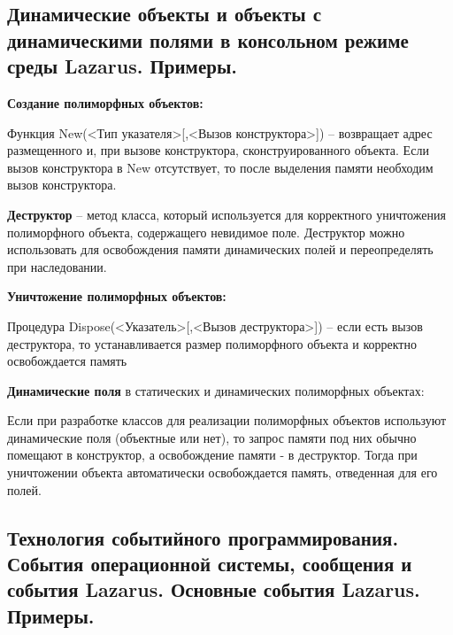 \newpage\subsection{Динамические объекты и объекты с динамическими полями в консольном режиме среды 
Lazarus. Примеры. }

\begin{myquote}
            
\end{myquote}

{\bf{Создание полиморфных объектов:}}

Функция New(<Тип указателя>[,<Вызов конструктора>]) – возвращает адрес размещенного и, при вызове конструктора, сконструированного объекта. Если вызов конструктора в New отсутствует, то после выделения памяти необходим вызов конструктора. 

{\bf{Деструктор}} – метод класса, который используется для корректного уничтожения полиморфного объекта, содержащего невидимое поле. Деструктор можно использовать для освобождения памяти динамических полей и переопределять при наследовании.

{\bf{Уничтожение полиморфных объектов:}}

Процедура Dispose(<Указатель>[,<Вызов деструктора>]) – если есть вызов деструктора, то устанавливается размер полиморфного объекта и корректно освобождается память

{\bf{Динамические поля}} в статических и динамических полиморфных 
объектах:

Если при разработке классов для реализации полиморфных объектов используют динамические поля (объектные или нет), то запрос памяти под них обычно помещают в конструктор, а освобождение памяти - в деструктор. Тогда при 
уничтожении объекта автоматически освобождается память, отведенная для его полей.





\newpage\subsection{Технология  событийного  программирования.  События  операционной  системы,  сообщения и события Lazarus. Основные события Lazarus. Примеры.}

\begin{myquote}
            
\end{myquote}

